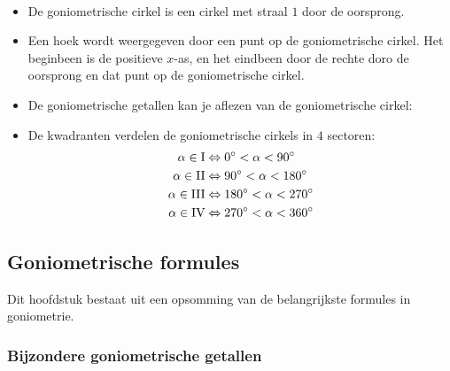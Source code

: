 \begin{onthoud}
	\ \\
	\begin{itemize}
	\item De goniometrische cirkel is een cirkel met straal $1$ door de oorsprong.
	\item Een hoek wordt weergegeven door een punt op de goniometrische cirkel. Het beginbeen is de positieve $x$-as, en het eindbeen door de rechte doro de oorsprong en dat punt op de goniometrische cirkel.
	\item De goniometrische getallen kan je aflezen van de goniometrische cirkel:
	\item De kwadranten verdelen de goniometrische cirkels in $4$ sectoren:
\begin{align*}
\alpha \in \textup{I} &\Leftrightarrow 0^\circ < \alpha < 90^\circ\\
\alpha \in \textup{II} &\Leftrightarrow 90^\circ < \alpha < 180^\circ\\
\alpha \in \textup{III} &\Leftrightarrow 180^\circ < \alpha < 270^\circ\\
\alpha \in \textup{IV} &\Leftrightarrow 270^\circ < \alpha < 360^\circ
\end{align*}
\end{itemize}

\end{onthoud}

\subsection{Goniometrische formules}

Dit hoofdstuk bestaat uit een opsomming van de belangrijkste formules in goniometrie.

\subsubsection{Bijzondere goniometrische getallen}

